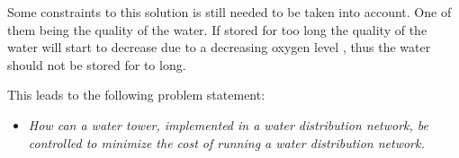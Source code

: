 Some constraints to this solution is still needed to be taken into account. One of them being the quality of the water. If stored for too long the quality of the water will start to decrease due to a decreasing oxygen level \cite{Lenntech,DO}, thus the water should not be stored for to long. 

This leads to the following problem statement:
\begin{itemize}
\item \textit{How can a water tower, implemented in a water distribution network, be controlled to minimize the cost of running a water distribution network.}
\end{itemize} 









